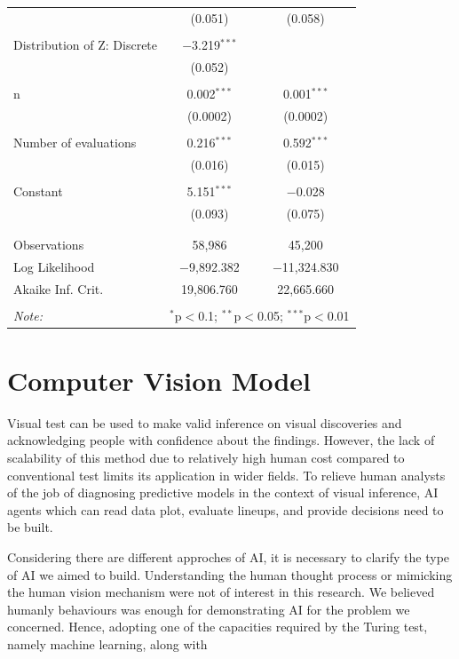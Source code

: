 \documentclass{monashthesis}
\theoremstyle{definition}
\theoremstyle{definition}
\theoremstyle{definition}
\theoremstyle{definition}
\theoremstyle{remark}
\begin{document}
\begin{table}[!htbp]
\begin{tabular}{@{\extracolsep{5pt}}lcc}
  & (0.051) & (0.058) \\ 
  & & \\ 
 Distribution of Z: Discrete & $-$3.219$^{***}$ &  \\ 
  & (0.052) &  \\ 
  & & \\ 
 n & 0.002$^{***}$ & 0.001$^{***}$ \\ 
  & (0.0002) & (0.0002) \\ 
  & & \\ 
 Number of evaluations & 0.216$^{***}$ & 0.592$^{***}$ \\ 
  & (0.016) & (0.015) \\ 
  & & \\ 
 Constant & 5.151$^{***}$ & $-$0.028 \\ 
  & (0.093) & (0.075) \\ 
  & & \\ 
\hline \\[-1.8ex] 
Observations & 58,986 & 45,200 \\ 
Log Likelihood & $-$9,892.382 & $-$11,324.830 \\ 
Akaike Inf. Crit. & 19,806.760 & 22,665.660 \\ 
\hline 
\hline \\[-1.8ex] 
\textit{Note:}  & \multicolumn{2}{r}{$^{*}$p$<$0.1; $^{**}$p$<$0.05; $^{***}$p$<$0.01} \\ 
\end{tabular} 
\end{table}

\hypertarget{computer-vision-model}{%
\chapter{Computer Vision Model}\label{computer-vision-model}}

Visual test can be used to make valid inference on visual discoveries and acknowledging people with confidence about the findings. However, the lack of scalability of this method due to relatively high human cost compared to conventional test limits its application in wider fields. To relieve human analysts of the job of diagnosing predictive models in the context of visual inference, AI agents which can read data plot, evaluate lineups, and provide decisions need to be built.

Considering there are different approches of AI, it is necessary to clarify the type of AI we aimed to build. Understanding the human thought process or mimicking the human vision mechanism were not of interest in this research. We believed humanly behaviours was enough for demonstrating AI for the problem we concerned. Hence, adopting one of the capacities required by the Turing test, namely machine learning, along with
\end{document}
